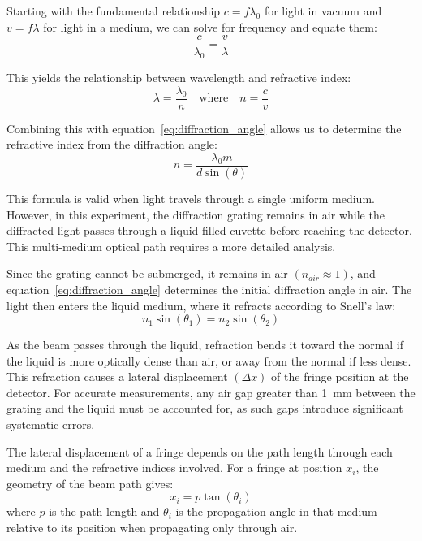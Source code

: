 Starting with the fundamental relationship \(c = f \lambda_0\) for light
in vacuum and \(v = f \lambda\) for light in a medium, we can solve for
frequency and equate them:
\begin{equation}
    \frac{c}{\lambda_0} = \frac{v}{\lambda}
    \label{eq:frequency_equivalence}
\end{equation}

This yields the relationship between wavelength and refractive index:
\begin{equation}
    \lambda = \frac{\lambda_0}{n} \quad \text{where} \quad n = \frac{c}{v}
    \label{eq:wavelength_refractive_index}
\end{equation}

Combining this with equation~\eqref{eq:diffraction_angle} allows us to determine the
refractive index from the diffraction angle:
\begin{equation}
    n = \frac{\lambda_0 m}{d \sin(\theta)}
    \label{eq:refractive_index_basic}
\end{equation}

This formula is valid when light travels through a single uniform
medium.
However, in this experiment, the diffraction grating remains in air
while the diffracted light passes through a liquid-filled cuvette
before reaching the detector.
This multi-medium optical path requires a more detailed analysis.

Since the grating cannot be submerged, it remains in air
\((n_{air} \approx 1)\), and equation~\eqref{eq:diffraction_angle} determines the initial
diffraction angle in air.
The light then enters the liquid medium, where it refracts according to
Snell's law:
\begin{equation}
    n_1 \sin(\theta_1) = n_2 \sin(\theta_2)
    \label{eq:snells_law}
\end{equation}

As the beam passes through the liquid, refraction bends it toward the
normal if the liquid is more optically dense than air, or away from the
normal if less dense.
This refraction causes a lateral displacement \((\Delta x)\) of the
fringe position at the detector.
For accurate measurements, any air gap greater than 1~mm between the
grating and the liquid must be accounted for, as such gaps introduce
significant systematic errors.

The lateral displacement of a fringe depends on the path length through
each medium and the refractive indices involved.
For a fringe at position \(x_i\), the geometry of the beam path gives:
\begin{equation}
    x_i = p \tan(\theta_i)
    \label{eq:fringe_position}
\end{equation}
where \(p\) is the path length and \(\theta_i\) is the propagation angle in
that medium relative to its position when propagating only through air.

